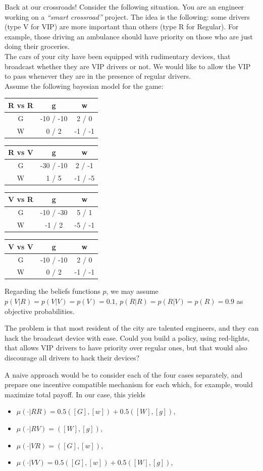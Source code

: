 \begin{example}
Back at our crossroads!
Consider the following situation. You are an engineer working on a \emph{``smart crossroad''} project. 
The idea is the following: some drivers (type V for VIP) are more important than others (type R for Regular). For example, those driving an ambulance should have priority on those who are just doing their groceries.\\
The cars of your city have been equipped with rudimentary devices, that broadcast whether they are VIP drivers or not. We would like to allow the VIP to pass whenever they are in the presence of regular drivers. \\
Assume the following bayesian model for the game:
\begin{center}
\begin{tabular}{c | c  c}
R vs R & g & w\\
\hline
G & -10 / -10 & 2 / 0  \\
W & 0 / 2 & -1 / -1 
\end{tabular}
\begin{tabular}{c | c  c}
R vs V & g & w\\
\hline 
G & -30 / -10 & 2 / -1  \\
W & 1 / 5 & -1 / -5 
\end{tabular}
\begin{tabular}{c | c  c}
V vs R & g & w\\
\hline 
G & -10 / -30 & 5 / 1  \\
W & -1 / 2 & -5 / -1 
\end{tabular}
\begin{tabular}{c | c  c}
V vs V & g & w\\
\hline 
G & -10 / -10 & 2 / 0  \\
W & 0 / 2 & -1 / -1 
\end{tabular}
\end{center}
Regarding the beliefs functions $p$, we may assume $p(V | R) = p(V | V) =  p(V) = 0.1$, $p(R | R) = p(R | V) = p(R) = 0.9$ as objective probabilities.

The problem is that most resident of the city are talented engineers, and they can hack the broadcast device with ease.
Could you build a policy, using red-lights, that allows VIP drivers to have priority over regular ones, but that would also discourage all drivers to hack their devices?



A naive approach would be to consider each of the four cases separately, and prepare one incentive compatible mechanism for each which, for example, would maximize total payoff.
In our case, this yields
\begin{itemize}
\item $\mu(\cdot | RR) = 0.5([G], [w]) + 0.5([W], [g])$,
\item $\mu(\cdot | RV) = ([W], [g])$,
\item $\mu(\cdot | VR) = ([G], [w])$,
\item $\mu(\cdot | VV) = 0.5([G], [w]) + 0.5([W], [g])$,
\end{itemize}


\end{example}
